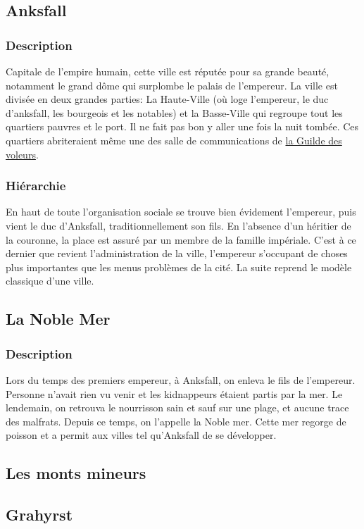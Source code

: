 \subsection{Anksfall}
\subsubsection{Description}
\hypertarget{anksfall}{}Capitale de l'empire humain, cette ville est réputée pour sa grande beauté,
notamment le grand dôme qui surplombe le palais de l'empereur. 
La ville est divisée en deux grandes parties: La Haute-Ville 
(où loge l’empereur, le duc d'anksfall, les bourgeois et les notables)
et la Basse-Ville qui regroupe tout les quartiers pauvres et le port.
Il ne fait pas bon y aller une fois la nuit tombée.
Ces quartiers abriteraient même une des salle de communications de \hyperlink {laguildedesvoleurs}{la Guilde des voleurs}.
\subsubsection{Hiérarchie}
En haut de toute l'organisation sociale se trouve bien évidement l’empereur, puis vient le duc d’Anksfall, traditionnellement son fils. En l’absence d’un héritier de la couronne, la place est assuré par un membre de la famille impériale. C’est à ce dernier que revient l’administration de la ville, l’empereur s’occupant de choses plus importantes que les menus problèmes de la cité. La suite reprend le modèle classique d’une ville. 
\subsection{La Noble Mer}
\subsubsection{Description}
\hypertarget{lanoblemer}{}Lors du temps des premiers empereur, à Anksfall, on enleva le fils de l'empereur.
Personne n'avait rien vu venir et les kidnappeurs étaient partis par la mer. 
Le lendemain, on retrouva le nourrisson sain  et sauf sur une plage, et aucune trace des malfrats.
Depuis ce temps, on l'appelle la Noble mer.
Cette mer regorge de poisson et a permit aux villes tel qu'Anksfall de se développer.
\subsection{Les monts mineurs}
\subsection{Grahyrst}
